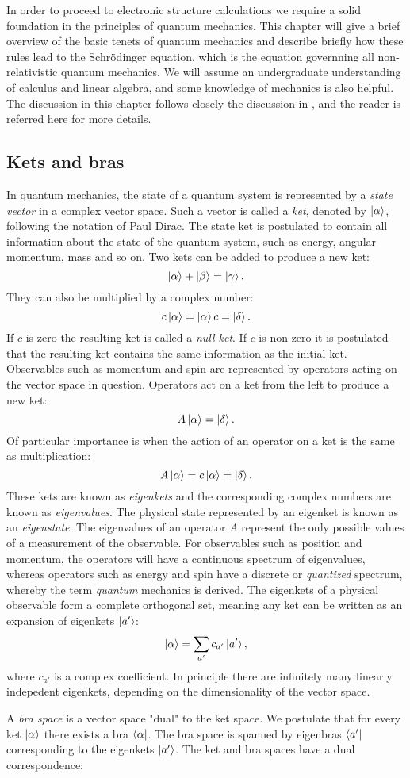 In order to proceed to electronic structure calculations
we require a solid foundation in the principles of quantum mechanics.
This chapter will give a brief overview of the basic tenets
of quantum mechanics and describe briefly how these rules lead
to the Schr\"{o}dinger equation, which is the equation governning
all non-relativistic quantum mechanics.
We will assume an undergraduate understanding of calculus and linear algebra,
and some knowledge of mechanics is also helpful.
The discussion in this chapter follows closely the discussion in
\parencite[Sakurai][pages 10-76]{sakurai1995modern},
and the reader is referred here for more details.

\subsection{Kets and bras}
In quantum mechanics, the state of a quantum system 
is represented by a \textit{state vector}
in a complex vector space. Such a vector is called a \textit{ket}, denoted
by $\ket{\alpha}$, following the notation of Paul Dirac. 
The state ket is postulated to contain all information
about the state of the quantum system, such as energy, angular momentum,
mass and so on. Two kets can be added to produce a new ket:
$$ \ket{\alpha} + \ket{\beta} = \ket{\gamma} .$$
They can also be multiplied by a complex number:
$$ c\ket{\alpha} = \ket{\alpha}c = \ket{\delta} .$$
If $c$ is zero the resulting ket is called a \textit{null ket}.
If $c$ is non-zero it is postulated that the resulting ket contains
the same information as the initial ket.
\newline
Observables such as momentum and spin are represented by operators
acting on the vector space in question. Operators
act on a ket from the left to produce a new ket:
$$ A \ket{\alpha} = \ket{\delta} .$$
Of particular importance is when the action of an operator
on a ket is the same as multiplication:
$$ A \ket{\alpha} = c\ket{\alpha} = \ket{\delta} .$$
These kets are known as \textit{eigenkets} and the corresponding
complex numbers are known as \textit{eigenvalues}.
The physical state represented by an eigenket is known
as an \textit{eigenstate}.
The eigenvalues of an operator $A$ represent
the only possible values of a measurement of the observable.
For observables such as position and momentum, the operators
will have a continuous spectrum of eigenvalues, whereas
operators such as energy and spin have a discrete or
\textit{quantized} spectrum, whereby the term
\textit{quantum} mechanics is derived.
The eigenkets of a physical observable form
a complete orthogonal set, meaning any ket
can be written as an expansion of eigenkets $\ket{a'}$:
$$ \ket{\alpha} = \sum_{a'} c_{a'} \ket{a'} ,$$
where $c_{a'}$ is a complex coefficient.
In principle there are infinitely many linearly indepedent eigenkets,
depending on the dimensionality of the vector space.
\par
A \textit{bra space} is a vector space "dual" to the ket space.
We postulate that for every ket $\ket{\alpha}$ there exists a bra
$\bra{\alpha}$. The bra space is spanned by eigenbras $\bra{a'}$
corresponding to the eigenkets $\ket{a'}$. The ket and bra spaces
have a dual correspondence:

